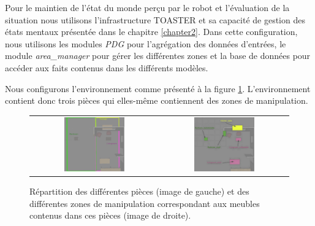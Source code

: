 \documentclass[a4paper,11pt,twoside]{StyleThese}
\begin{document}
Pour le maintien de l'état du monde perçu par le robot et l'évaluation de la situation nous utilisons l'infrastructure TOASTER et sa capacité de gestion des états mentaux présentée dans le chapitre \ref{chapter2}.
Dans cette configuration, nous utilisons les modules \textit{PDG} pour l'agrégation des données d'entrées, le module \textit{area\_manager} pour gérer les différentes zones et la base de données pour accéder aux faits contenus dans les différents modèles.

Nous configurons l'environnement comme présenté à la figure \ref{fig:areasMardi}.
L'environnement contient donc trois pièces qui elles-même contiennent des zones de manipulation.

\begin{figure}[ht!]
 \centering
 \begin{tabular}{cc}
  \includegraphics[width=0.49\textwidth]{img/areas.jpg} &
  \includegraphics[width=0.49\textwidth]{img/furnitures.jpg}
 \end{tabular}
 \caption{Répartition des différentes pièces (image de gauche) et des différentes zones de manipulation correspondant aux meubles contenus dans ces pièces (image de droite).}
 \label{fig:areasMardi}
 \end{figure}
\end{document}
